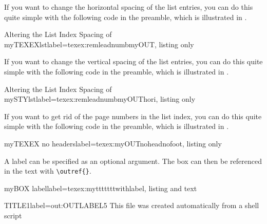 \documentclass[]{myHOWTO-V001}
\begin{document}
If you want to change the horizontal spacing of the list entries, you can do this quite simple with the following code in the preamble, which is illustrated in .

\begin{myTEXEXdoclst}{Altering the List Index Spacing of myTEXEXlst}{label={texex:remleadnumbmyOUT}, listing only}
\makeatletter
	\renewcommand{\l@myOUT}{\@dottedtocline{1}{0mm}{0mm}}
\makeatother
\end{myTEXEXdoclst}

If you want to change the vertical spacing of the list entries, you can do this quite simple with the following code in the preamble, which is illustrated in .

\begin{myTEXEXdoclst}{Altering the List Index Spacing of mySTYlst}{label={texex:remleadnumbmyOUThori}, listing only}
\makeatletter
\makeatother
\end{myTEXEXdoclst}

If you want to get rid of the page numbers in the list index, you can do this quite simple with the following code in the preamble, which is illustrated in .

\begin{myTEXEXdoclst}{myTEXEX no headers}{label={texex:myOUTnoheadnofoot}, listing only}
\let\oldlistofmyOUT\listofmyOUT
	
\renewcommand\listofmyOUT
{
	\pagestyle{empty} %
	\oldlistofmyOUT %
	\clearpage %
	\pagestyle{plain} %
}
\end{myTEXEXdoclst}

A label can be specified as an optional argument. The box can then be referenced in the text with \Verb|\outref{}|.

\begin{myTEXEXdoclst}{myBOX label}{label={texex:mytttttttwithlabel}, listing and text}
\begin{myOUTlst}{TITLE1}{label={out:OUTLABEL5}}
This file was created automatically from
a shell script
\end{myOUTlst}
\end{myTEXEXdoclst}
\end{document}
